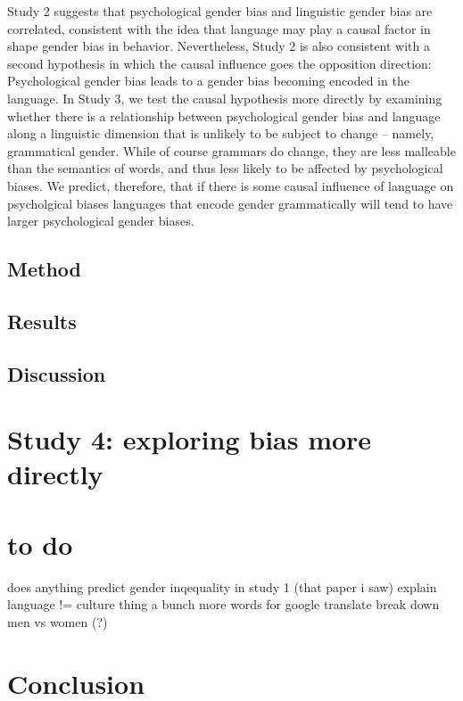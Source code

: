 \documentclass[10pt, letterpaper]{article}
\begin{document}
Study 2 suggests that psychological gender bias and linguistic gender
bias are correlated, consistent with the idea that language may play a
causal factor in shape gender bias in behavior. Nevertheless, Study 2 is
also consistent with a second hypothesis in which the causal influence
goes the opposition direction: Psychological gender bias leads to a
gender bias becoming encoded in the language. In Study 3, we test the
causal hypothesis more directly by examining whether there is a
relationship between psychological gender bias and language along a
linguistic dimension that is unlikely to be subject to change -- namely,
grammatical gender. While of course grammars do change, they are less
malleable than the semantics of words, and thus less likely to be
affected by psychological biases. We predict, therefore, that if there
is some causal influence of language on psycholgical biases languages
that encode gender grammatically will tend to have larger psychological
gender biases.

\subsection{Method}\label{method-3}

\subsection{Results}\label{results-3}

\subsection{Discussion}\label{discussion-2}

\section{Study 4: exploring bias more
directly}\label{study-4-exploring-bias-more-directly}

\section{to do}\label{to-do}

does anything predict gender inqequality in study 1 (that paper i saw)
explain language != culture thing a bunch more words for google
translate break down men vs women (?)

\section{Conclusion}\label{conclusion}
\end{document}
